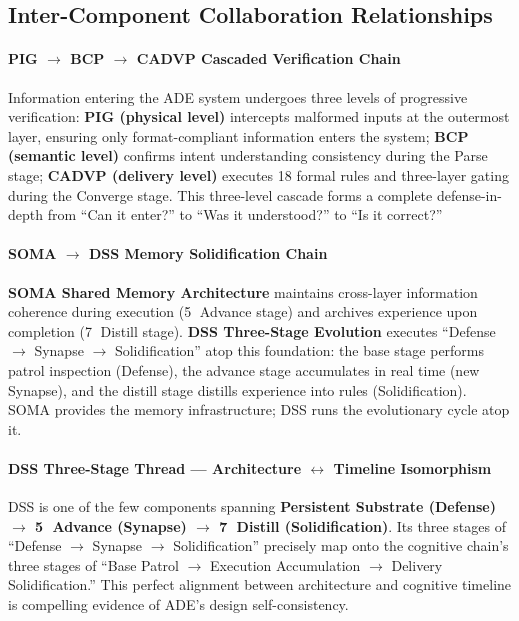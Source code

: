 \documentclass[11pt,a4paper]{article}
\begin{document}
\subsection{Inter-Component Collaboration Relationships}
\label{sec:10.3}

\paragraph{PIG $\rightarrow$ BCP $\rightarrow$ CADVP Cascaded Verification Chain}
Information entering the ADE system undergoes three levels of progressive verification: \textbf{PIG (physical level)} intercepts malformed inputs at the outermost layer, ensuring only format-compliant information enters the system; \textbf{BCP (semantic level)} confirms intent understanding consistency during the Parse stage; \textbf{CADVP (delivery level)} executes 18 formal rules and three-layer gating during the Converge stage. This three-level cascade forms a complete defense-in-depth from ``Can it enter?'' to ``Was it understood?'' to ``Is it correct?''

\paragraph{SOMA $\rightarrow$ DSS Memory Solidification Chain}
\textbf{SOMA Shared Memory Architecture} maintains cross-layer information coherence during execution (\textcircled{5} Advance stage) and archives experience upon completion (\textcircled{7} Distill stage). \textbf{DSS Three-Stage Evolution} executes ``Defense $\rightarrow$ Synapse $\rightarrow$ Solidification'' atop this foundation: the base stage performs patrol inspection (Defense), the advance stage accumulates in real time (new Synapse), and the distill stage distills experience into rules (Solidification). SOMA provides the memory infrastructure; DSS runs the evolutionary cycle atop it.

\paragraph{DSS Three-Stage Thread --- Architecture $\leftrightarrow$ Timeline Isomorphism}
DSS is one of the few components spanning \textbf{Persistent Substrate (Defense) $\rightarrow$ \textcircled{5} Advance (Synapse) $\rightarrow$ \textcircled{7} Distill (Solidification)}. Its three stages of ``Defense $\rightarrow$ Synapse $\rightarrow$ Solidification'' precisely map onto the cognitive chain's three stages of ``Base Patrol $\rightarrow$ Execution Accumulation $\rightarrow$ Delivery Solidification.'' This perfect alignment between architecture and cognitive timeline is compelling evidence of ADE's design self-consistency.
\end{document}
